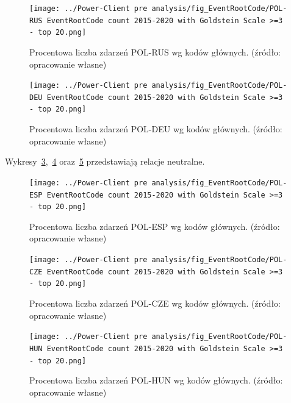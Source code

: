 \documentclass[11pt]{report}
\begin{document}
    \begin{figure}[!htp]
        \centering
        \texttt{[image: ../Power-Client pre analysis/fig\_EventRootCode/POL-RUS EventRootCode count 2015-2020 with Goldstein Scale >=3 - top 20.png]}
        \caption{Procentowa liczba zdarzeń POL-RUS wg kodów głównych. (źródło: opracowanie własne)}
        \label{fig:Power-Client:ERC:Goldstein:POL-RUS}
    \end{figure}

    \begin{figure}[!htp]
        \centering
        \texttt{[image: ../Power-Client pre analysis/fig\_EventRootCode/POL-DEU EventRootCode count 2015-2020 with Goldstein Scale >=3 - top 20.png]}
        \caption{Procentowa liczba zdarzeń POL-DEU wg kodów głównych. (źródło: opracowanie własne)}
        \label{fig:Power-Client:ERC:Goldstein:POL-DEU}
    \end{figure}

    Wykresy~\ref{fig:Power-Client:ERC:Goldstein:POL-ESP},~\ref{fig:Power-Client:ERC:Goldstein:POL-CZE} oraz~\ref{fig:Power-Client:ERC:Goldstein:POL-HUN} przedstawiają relacje neutralne.
    \begin{figure}[!htp]
        \centering
        \texttt{[image: ../Power-Client pre analysis/fig\_EventRootCode/POL-ESP EventRootCode count 2015-2020 with Goldstein Scale >=3 - top 20.png]}
        \caption{Procentowa liczba zdarzeń POL-ESP wg kodów głównych. (źródło: opracowanie własne)}
        \label{fig:Power-Client:ERC:Goldstein:POL-ESP}
    \end{figure}

    \begin{figure}[!htp]
        \centering
        \texttt{[image: ../Power-Client pre analysis/fig\_EventRootCode/POL-CZE EventRootCode count 2015-2020 with Goldstein Scale >=3 - top 20.png]}
        \caption{Procentowa liczba zdarzeń POL-CZE wg kodów głównych. (źródło: opracowanie własne)}
        \label{fig:Power-Client:ERC:Goldstein:POL-CZE}
    \end{figure}

    \begin{figure}[!htp]
        \centering
        \texttt{[image: ../Power-Client pre analysis/fig\_EventRootCode/POL-HUN EventRootCode count 2015-2020 with Goldstein Scale >=3 - top 20.png]}
        \caption{Procentowa liczba zdarzeń POL-HUN wg kodów głównych. (źródło: opracowanie własne)}
        \label{fig:Power-Client:ERC:Goldstein:POL-HUN}
    \end{figure}
\end{document}
